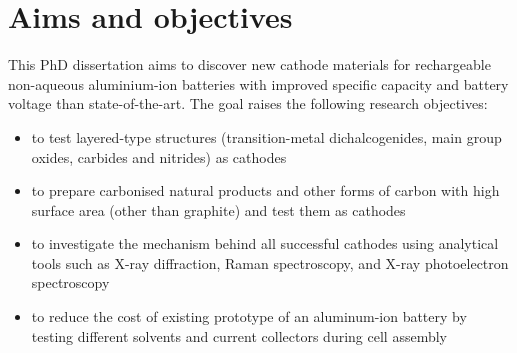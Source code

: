 \section*{\centering Aims and objectives}
This PhD dissertation aims to discover new cathode materials for rechargeable non-aqueous aluminium-ion batteries with improved specific capacity and battery voltage than state-of-the-art. The goal raises the following research objectives:
\begin{itemize}
    \item to test layered-type structures (transition-metal dichalcogenides, main group oxides, carbides and nitrides) as cathodes 
    \item to prepare carbonised natural products and other forms of carbon with high surface area (other than graphite) and test them as cathodes 
    \item to investigate the mechanism behind all successful cathodes using analytical tools such as X-ray diffraction, Raman spectroscopy, and X-ray photoelectron spectroscopy
    \item to reduce the cost of existing prototype of an aluminum-ion battery by testing different solvents and current collectors during cell assembly
    
\end{itemize}
\newpage
\newpage
